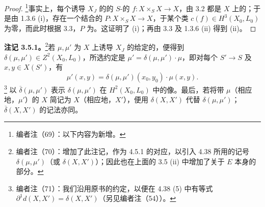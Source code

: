 \begin{proof}
\footnote{编者注（69）：以下内容为新增。}事实上，每个诱导 $X_J$ 的的 $S$-的 $f:X\times_S X\to X$，由 3.2 都是 $X$ 上的；于是由 1.3.6 (i)，存在一个结合的 $P:X\times_S X\to X$，于某个类 $c(f)\in H^3(X_0,L_0)$ 为零，而此时根据 3.3，$P$ 为。这证明了 (i)；再由 3.3 及 1.3.6 (ii) 得到 (ii)。
\end{proof}
\textbf{注记 3.5.1。}\footnote{编者注（70）：增加了此注记，作为 4.5.1 的对应，以引入 4.38 所用的记号 $\delta(\mu,\mu')$（或 $\delta(X,X')$）；因此也在上面的 3.5 (ii) 中增加了关于 $E$ 本身的部分。}若 $\mu,\mu'$ 为 $X$ 上诱导 $X_J$ 的给定的，便得到 $\delta(\mu,\mu')\in Z^2(X_0,L_0)$，所选约定是
$\mu'=\delta(\mu,\mu')\cdot\mu$，即对每个 $S'\to S$ 及 $x,y\in X(S')$，有
\[
 \mu'(x,y)=\delta(\mu,\mu')(x_0,y_0)\cdot\mu(x,y).
\]\footnote{编者注（71）：我们沿用原书的约定，以便在 4.38 (5) 中有等式 $\partial^1d(X,X')=\delta(X,X')$（另见编者注（54））。}
以 $\overline\delta(\mu,\mu')$ 表示 $\delta(\mu,\mu')$ 在 $H^2(X_0,L_0)$ 中的像。最后，若将带 $\mu$（相应地，$\mu'$）的 $X$ 简记为 $X$（相应地，$X'$），便用 $\delta(X,X')$ 代替 $\delta(\mu,\mu')$；$\overline\delta(X,X')$ 的记法亦同。

